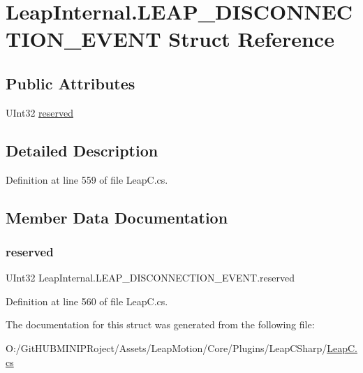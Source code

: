 \hypertarget{struct_leap_internal_1_1_l_e_a_p___d_i_s_c_o_n_n_e_c_t_i_o_n___e_v_e_n_t}{}\section{Leap\+Internal.\+L\+E\+A\+P\+\_\+\+D\+I\+S\+C\+O\+N\+N\+E\+C\+T\+I\+O\+N\+\_\+\+E\+V\+E\+NT Struct Reference}
\label{struct_leap_internal_1_1_l_e_a_p___d_i_s_c_o_n_n_e_c_t_i_o_n___e_v_e_n_t}
\subsection*{Public Attributes}
\begin{DoxyCompactItemize}
\item 
U\+Int32 \mbox{\hyperlink{struct_leap_internal_1_1_l_e_a_p___d_i_s_c_o_n_n_e_c_t_i_o_n___e_v_e_n_t_a74a78d296aa37b2c1c2a1b409c176e0c}{reserved}}
\end{DoxyCompactItemize}


\subsection{Detailed Description}


Definition at line 559 of file Leap\+C.\+cs.



\subsection{Member Data Documentation}
\mbox{\label{struct_leap_internal_1_1_l_e_a_p___d_i_s_c_o_n_n_e_c_t_i_o_n___e_v_e_n_t_a74a78d296aa37b2c1c2a1b409c176e0c}} 
\subsubsection{\texorpdfstring{reserved}{reserved}}
{\footnotesize\ttfamily U\+Int32 Leap\+Internal.\+L\+E\+A\+P\+\_\+\+D\+I\+S\+C\+O\+N\+N\+E\+C\+T\+I\+O\+N\+\_\+\+E\+V\+E\+N\+T.\+reserved}



Definition at line 560 of file Leap\+C.\+cs.



The documentation for this struct was generated from the following file\+:\begin{DoxyCompactItemize}
\item 
O\+:/\+Git\+H\+U\+B\+M\+I\+N\+I\+P\+Roject/\+Assets/\+Leap\+Motion/\+Core/\+Plugins/\+Leap\+C\+Sharp/\mbox{\hyperlink{_leap_c_8cs}{Leap\+C.\+cs}}\end{DoxyCompactItemize}
